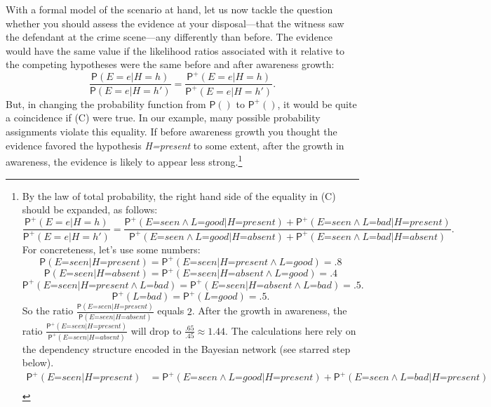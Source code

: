 \documentclass[
  11pt,
  dvipsnames,enabledeprecatedfontcommands]{scrartcl}
\newcommand{\pr}[1]{\ensuremath{\mathsf{P}(#1)}}
\newcommand{\ppr}[2]{\ensuremath{\mathsf{P}^{#1}(#2)}}
\begin{document}
With a formal model of the scenario at hand, let us now tackle the
question whether you should assess the evidence at your disposal---that
the witness saw the defendant at the crime scene---any differently than
before. The evidence would have the same value if the likelihood ratios
associated with it relative to the competing hypotheses were the same
before and after awareness growth:
\[\frac{\pr{E=e \vert H=h}}{\pr{E=e \vert H=h'}}= \frac{\ppr{+}{E=e \vert H=h}}{\ppr{+}{E=e \vert H=h'}} \tag{C}.\]
But, in changing the probability function from \(\pr{}\) to
\(\ppr{+}{}\), it would be quite a coincidence if (C) were true. In our
example, many possible probability assignments violate this equality. If
before awareness growth you thought the evidence favored the hypothesis
\textit{H=present} to some extent, after the growth in awareness, the
evidence is likely to appear less strong.\footnote{By the law of total
  probability, the right hand side of the equality in (C) should be
  expanded, as follows:
  \[\frac{\ppr{+}{E=e \vert H=h}}{\ppr{+}{E=e \vert H=h'}}=\frac{\ppr{+}{\textit{E=seen} \wedge \textit{L=good} \vert \textit{H=present}}+\ppr{+}{\textit{E=seen} \wedge \textit{L=bad} \vert \textit{H=present}}}{\ppr{+}{\textit{E=seen} \wedge \textit{L=good} \vert \textit{H=absent}}+\ppr{+}{\textit{E=seen} \wedge \textit{L=bad} \vert \textit{H=absent}}}.\]
  For concreteness, let's use some numbers:
  \[\pr{\textit{E=seen} \vert \textit{H=present}}=\ppr{+}{\textit{E=seen} \vert \textit{H=present} \wedge \textit{L=good}}=.8\]
  \[\pr{\textit{E=seen} \vert \textit{H=absent}}=\ppr{+}{\textit{E=seen} \vert \textit{H=absent} \wedge \textit{L=good}}=.4\]
  \[\ppr{+}{\textit{E=seen} \vert \textit{H=present} \wedge \textit{L=bad}} = \ppr{+}{\textit{E=seen} \vert \textit{H=absent} \wedge \textit{L=bad}}=.5.\]
  \[\ppr{+}{\textit{L=bad}} = \ppr{+}{\textit{L=good}}=.5.\] So the
  ratio
  \(\frac{\pr{\textit{E=seen} \vert \textit{H=present}}}{\pr{\textit{E=seen} \vert \textit{H=absent}}}\)
  equals \(2\). After the growth in awareness, the ratio
  \(\frac{\ppr{+}{\textit{E=seen} \vert \textit{H=present}}}{\ppr{+}{\textit{E=seen} \vert \textit{H=absent}}}\)
  will drop to \(\frac{.65}{.45}\approx 1.44\). The calculations here
  rely on the dependency structure encoded in the Bayesian network (see
  starred step below). \begin{align*}
  \ppr{+}{\textit{E=seen} \vert \textit{H=present}} &= \ppr{+}{\textit{E=seen} \wedge \textit{L=good} \vert \textit{H=present}}+\ppr{+}{\textit{E=seen} \wedge \textit{L=bad} \vert \textit{H=present}}\\

\end{align*}}
\end{document}
